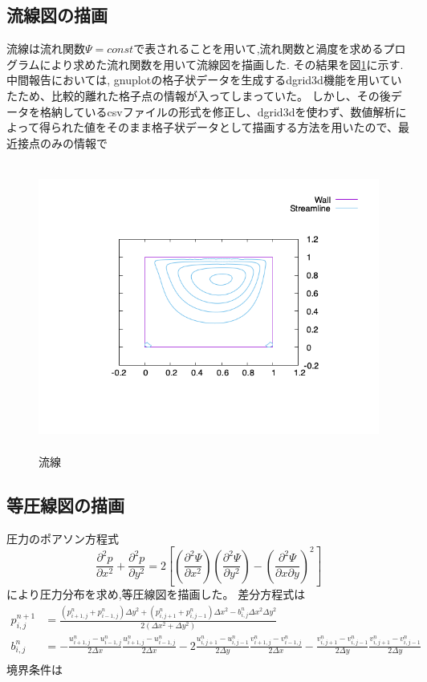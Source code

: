 \documentclass[upLaTeX,a4paper]{jsarticle}
\begin{document}
\subsection{流線図の描画}
流線は流れ関数$\varPsi = const$で表されることを用いて,流れ関数と渦度を求めるプログラムにより求めた流れ関数を用いて流線図を描画した.
その結果を図\ref{fig:stream_line}に示す.
中間報告においては, gnuplotの格子状データを生成するdgrid3d機能を用いていたため、比較的離れた格子点の情報が入ってしまっていた。
しかし、その後データを格納しているcsvファイルの形式を修正し、dgrid3dを使わず、数値解析によって得られた値をそのまま格子状データとして描画する方法を用いたので、最近接点のみの情報で

\begin{figure}[H]
  \centering
  \includegraphics[height=9.5cm]{outputs/img/stream_line.png}
  \caption{流線}
  \label{fig:stream_line}
\end{figure}
\subsection{等圧線図の描画}
圧力のポアソン方程式
\begin{equation}
  \frac{\partial ^2 p}{\partial x ^2} + \frac{\partial ^2 p}{\partial y ^2} = 2 \left[ \left(\frac{\partial ^2 \varPsi}{\partial x ^2}\right) \left(\frac{\partial ^2 \varPsi}{\partial y ^2}\right) - \left( \frac{\partial ^2 \varPsi}{\partial x \partial y}  \right) ^2 \right]
\end{equation}
により圧力分布を求め,等圧線図を描画した。
差分方程式は
\begin{equation}
  \begin{split}
    p_{i,j}^{n+1} & =\frac{(p_{i+1,j}^{n}+p_{i-1,j}^{n})\Delta y^2+(p_{i,j+1}^{n}+p_{i,j-1}^{n})\Delta x^2-b_{i,j}^{n}\Delta x^2\Delta y^2}{2(\Delta x^2+\Delta y^2)}\\
    b_{i,j}^{n} & =  -\frac{u_{i+1,j}^{n}-u_{i-1,j}^{n}}{2\Delta x}\frac{u_{i+1,j}^{n}-u_{i-1,j}^{n}}{2\Delta x}-2\frac{u_{i,j+1}^{n}-u_{i,j-1}^{n}}{2\Delta y}\frac{v_{i+1,j}^{n}-v_{i-1,j}^{n}}{2\Delta x} -\frac{v_{i,j+1}^{n}-v_{i,j-1}^{n}}{2\Delta y}\frac{v_{i,j+1}^{n}-v_{i,j-1}^{n}}{2\Delta y} \\
  \end{split}
\end{equation}
境界条件は
\end{document}
